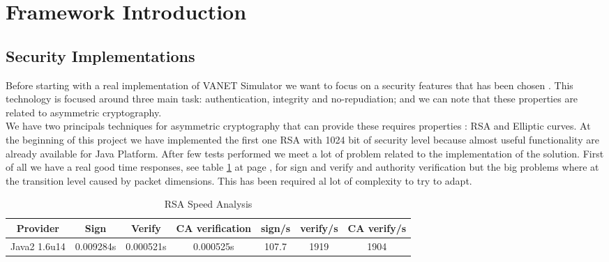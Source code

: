 \section{Framework Introduction}
\subsection{Security Implementations}
Before starting with  a real implementation of VANET Simulator we want to focus on a security features  that has been chosen . This technology is focused around three main task: authentication, integrity and no-repudiation; and we can note that these properties are related to asymmetric cryptography.\\ 
We have two  principals techniques for asymmetric cryptography that can provide these requires properties : RSA and Elliptic curves. At the beginning of this project we have implemented the first one RSA  with 1024 bit of security level because almost useful functionality are already available for Java Platform. After few tests performed we meet a lot of problem related to the implementation of the solution. First of all we have a  real good time responses, see table \ref{tab:RSAVelocity} at page \pageref{tab:RSAVelocity}, for sign and verify and authority verification but the big problems where at the transition level caused by packet dimensions. This has been required al lot of complexity to try to adapt.

\begin{table}[!ht]
	\centering
	\caption{RSA Speed Analysis}
	\begin{tabular}{|c|c|c|c|c|c|c|}
	\hline\hline 
	\textbf{Provider} & \textbf{Sign} & \textbf{Verify} & \textbf{CA verification} & \textbf{sign/s} & \textbf{verify/s}  & \textbf{CA verify/s}\\
	\hline
	Java2 1.6u14 & 0.009284s & 0.000521s & 0.000525s & 107.7 & 1919 & 1904 \\
	\hline
	\hline     %
 	\end{tabular} 
	\label{tab:RSAVelocity}
\end{table}
